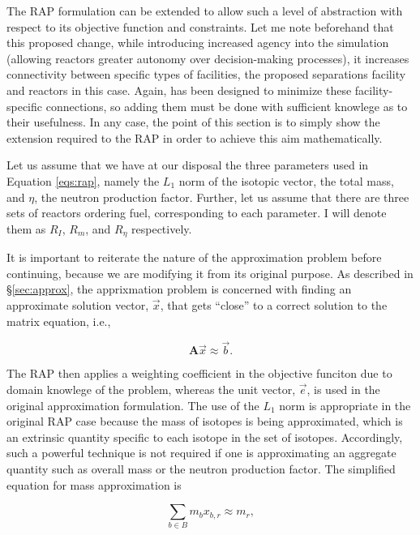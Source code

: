 The RAP formulation can be extended to allow such a level of abstraction with
respect to its objective function and constraints. Let me note beforehand that
this proposed change, while introducing increased agency into the simulation
(allowing reactors greater autonomy over decision-making processes), it
increases connectivity between specific types of facilities, the proposed
separations facility and reactors in this case. Again, \Cyclus has been designed
to minimize these facility-specific connections, so adding them must be done
with sufficient knowlege as to their usefulness. In any case, the point of this
section is to simply show the extension required to the RAP in order to achieve
this aim mathematically.

Let us assume that we have at our disposal the three parameters used in Equation
\ref{eqs:rap}, namely the $L_1$ norm of the isotopic vector, the total mass, and
$\eta$, the neutron production factor. Further, let us assume that there are
three sets of reactors ordering fuel, corresponding to each parameter. I will
denote them as $R_I$, $R_m$, and $R_\eta$ respectively. 

It is important to reiterate the nature of the approximation problem before
continuing, because we are modifying it from its original purpose. As described
in \S\ref{sec:approx}, the apprixmation problem is concerned with finding an
approximate solution vector, $\vec{x}$, that gets ``close'' to a correct
solution to the matrix equation, i.e., 

\begin{equation*}
  \mathbf{A} \vec{x} \approx \vec{b}.
\end{equation*}

The RAP then applies a weighting coefficient in the objective funciton due to
domain knowlege of the problem, whereas the unit vector, $\vec{e}$, is used in
the original approximation formulation. The use of the $L_1$ norm is appropriate
in the original RAP case because the mass of isotopes is being approximated,
which is an extrinsic quantity specific to each isotope in the set of
isotopes. Accordingly, such a powerful technique is not required if one is
approximating an aggregate quantity such as overall mass or the neutron
production factor. The simplified equation for mass approximation is

\begin{equation*}
  \sum_{b \in B} m_{b} x_{b,r} \approx m_{r},
\end{equation*}

